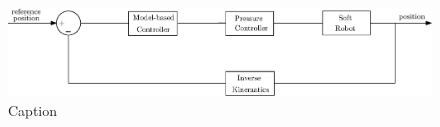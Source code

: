 \begin{figure}[H]
    \centering
    \includegraphics[width = \textwidth]{Figures/Chapter1/controlscheme.eps}
    \caption{Caption}
    \label{fig:my_label}
\end{figure}





